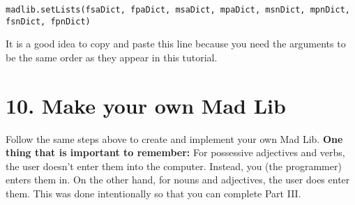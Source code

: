 \documentclass[a4paper,11pt]{article}
\theoremstyle{mytheor}
\begin{document}
\begin{lstlisting}[label={list:second},caption=Copy this code(below the creation of your lists)]
madlib.setLists(fsaDict, fpaDict, msaDict, mpaDict, msnDict, mpnDict, fsnDict, fpnDict)
\end{lstlisting}
It is a good idea to copy and paste this line because you need the arguments to be the same order as they appear in this tutorial. 

\section*{10. Make your own Mad Lib}

Follow the same steps above to create and implement your own Mad Lib.
\newline
\newline
\textbf{One thing that is important to remember:} For possessive adjectives and verbs, the user doesn't enter them into the computer. Instead, you (the programmer) enters them in. On the other hand, for nouns and adjectives, the user does enter them. This was done intentionally so that you can complete Part III.
\end{document}
